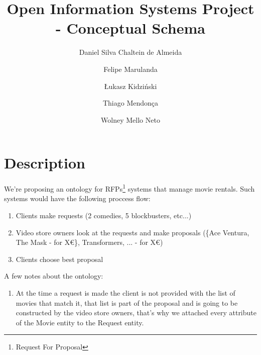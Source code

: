 \documentclass[a4paper,10pt]{article}
\title{Open Information Systems Project - Conceptual Schema}
\author{Daniel Silva Chaltein de Almeida \and Felipe Marulanda \and Łukasz Kidziński \and Thiago Mendonça \and Wolney Mello Neto}
\begin{document}
\maketitle

\section{Description}
  We're proposing an ontology for RFPs\footnote{Request For Proposal} systems that manage movie rentals. Such systems would have the following proccess flow:
  \begin{enumerate}
    \item Clients make requests (2 comedies, 5 blockbusters, etc...)
    \item Video store owners look at the requests and make proposals (\{{}Ace Ventura, The Mask - for X\euro\}, {Transformers, ... - for X\euro})
    \item Clients choose best proposal
  \end{enumerate}
  A few notes about the ontology:
\begin{enumerate}
  \item At the time a request is made the client is not provided with the list of movies that match it, that list is part of the proposal and is going to be constructed by the video store owners, that's why we attached every attribute of the Movie entity to the Request entity.
\end{enumerate}
\end{document}
